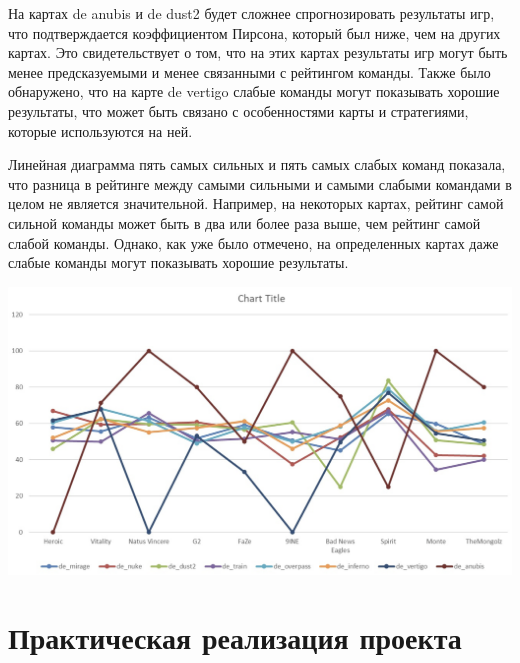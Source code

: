 \documentclass[utf8,14pt,a4paper,oneside,russian]{book}
\begin{document}
На картах de anubis и de dust2 будет сложнее спрогнозировать результаты игр, 
что подтверждается коэффициентом Пирсона, который был ниже, чем на других 
картах. Это свидетельствует о том, что на этих картах результаты игр могут 
быть менее предсказуемыми и менее связанными с рейтингом команды. 
Также было обнаружено, что на карте de vertigo слабые команды могут показывать 
хорошие результаты, что может быть связано с особенностями карты и стратегиями, 
которые используются на ней.

Линейная диаграмма пять самых сильных и пять самых слабых команд показала, 
что разница в рейтинге между самыми сильными и самыми слабыми командами в 
целом не является значительной. Например, на некоторых картах, рейтинг самой 
сильной команды может быть в два или более раза выше, чем рейтинг самой 
слабой команды. Однако, как уже было отмечено, на определенных картах даже 
слабые команды могут показывать хорошие результаты.

\includegraphics[width=15cm]{graf1}


\newpage
    \section{Практическая реализация проекта}
\end{document}
